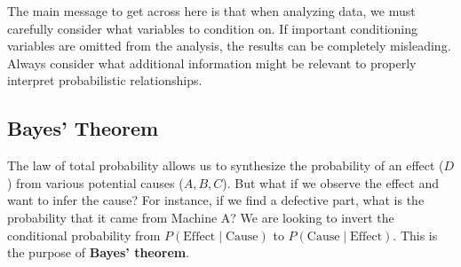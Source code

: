 The main message to get across here is that when analyzing data, we must carefully consider what variables to condition on. If important conditioning variables are omitted from the analysis, the results can be completely misleading. Always consider what additional information might be relevant to properly interpret probabilistic relationships.

\subsection{Bayes' Theorem}
The law of total probability allows us to synthesize the probability of an effect ($D$) from various potential causes ($A, B, C$). But what if we observe the effect and want to infer the cause? For instance, if we find a defective part, what is the probability that it came from Machine A? We are looking to invert the conditional probability from $P(\text{Effect} \mid \text{Cause})$ to $P(\text{Cause} \mid \text{Effect})$. This is the purpose of \textbf{Bayes' theorem}.

